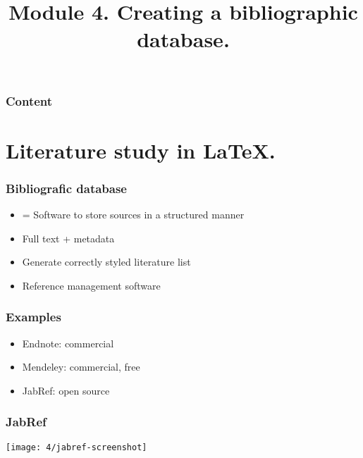 \documentclass[aspectratio=169]{beamer}
\title{Module 4. Creating a bibliographic database.}
\subtitle{\coursename}
\author{\lecturers}   %
\date{\academicyear}
\begin{document}
\begin{frame}
  \maketitle
\end{frame}

\begin{frame}
  \frametitle{Content}

  \tableofcontents
\end{frame}

\section{Literature study in {\LaTeX}.}

\begin{frame}
    \frametitle{Bibliografic database}
    
    \begin{itemize}
        \item = Software to store sources in a structured manner
        \item Full text + metadata
        \item Generate correctly styled literature list
        \item Reference management software
    \end{itemize}    
\end{frame}

\begin{frame}
    \frametitle{Examples}
    
    \begin{itemize}
        \item Endnote: commercial
        \item Mendeley: commercial, free
        \item JabRef: open source
    \end{itemize}
    
\end{frame}

\begin{frame}[plain]
    \frametitle{JabRef}
    
    \centering
    \texttt{[image: 4/jabref-screenshot]}
    
\end{frame}
\end{document}
